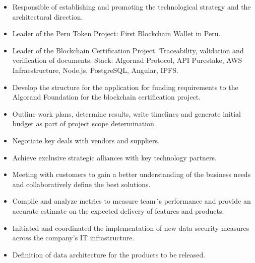 

\begin{itemize}
    \item Responsible of establishing and promoting the technological strategy and the architectural direction.
    \item Leader of the Peru Token Project: First Blockchain Wallet in Peru.
    \item Leader of the Blockchain Certification Project. Traceability, validation and verification of documents. Stack: Algornad Protocol, API Purestake, AWS Infraestructure, Node.js, PostgreSQL, Angular, IPFS.
    \item Develop the structure for the application for funding requirements to the Algorand Foundation for the blockchain certification project.
    \item Outline work plans, determine results, write timelines and generate initial budget as part of project scope determination.
    \item Negotiate key deals with vendors and suppliers.
    \item Achieve exclusive strategic alliances with key technology partners.
    \item Meeting with customers to gain a better understanding of the business needs and collaboratively define the best solutions.
    \item Compile and analyze metrics to measure team´s performance and provide an accurate estimate on the expected delivery of features and products.
    \item Initiated and coordinated the implementation of new data security measures across the company’s IT infrastructure.
    \item Definition of data architecture for the products to be released.
\end{itemize}

\divider


